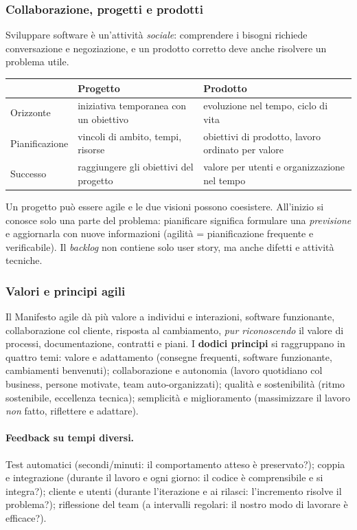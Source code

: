 \documentclass[a4paper,12pt]{article}
\begin{document}
\subsubsection{Collaborazione, progetti e prodotti}
Sviluppare software è un'attività \emph{sociale}: comprendere i bisogni richiede
conversazione e negoziazione, e un prodotto corretto deve anche risolvere un problema utile.
\begin{center}
\begin{tabular}{|p{2.6cm}|p{6.2cm}|p{6.2cm}|}
\hline
 & \textbf{Progetto} & \textbf{Prodotto}\\
\hline
Orizzonte & iniziativa temporanea con un obiettivo & evoluzione nel tempo, ciclo di vita\\
Pianificazione & vincoli di ambito, tempi, risorse & obiettivi di prodotto, lavoro ordinato per valore\\
Successo & raggiungere gli obiettivi del progetto & valore per utenti e organizzazione nel tempo\\
\hline
\end{tabular}
\end{center}
Un progetto può essere agile e le due visioni possono coesistere. All'inizio si conosce
solo una parte del problema: pianificare significa formulare una \emph{previsione} e
aggiornarla con nuove informazioni (agilità = pianificazione frequente e verificabile).
Il \emph{backlog} non contiene solo user story, ma anche difetti e attività tecniche.

\subsubsection{Valori e principi agili}
Il Manifesto agile dà più valore a individui e interazioni, software funzionante,
collaborazione col cliente, risposta al cambiamento, \emph{pur riconoscendo} il valore di
processi, documentazione, contratti e piani. I \textbf{dodici principi} si raggruppano in
quattro temi: valore e adattamento (consegne frequenti, software funzionante, cambiamenti
benvenuti); collaborazione e autonomia (lavoro quotidiano col business, persone motivate,
team auto-organizzati); qualità e sostenibilità (ritmo sostenibile, eccellenza tecnica);
semplicità e miglioramento (massimizzare il lavoro \emph{non} fatto, riflettere e adattare).

\paragraph{Feedback su tempi diversi.} Test automatici (secondi/minuti: il comportamento
atteso è preservato?); coppia e integrazione (durante il lavoro e ogni giorno: il codice è
comprensibile e si integra?); cliente e utenti (durante l'iterazione e ai rilasci:
l'incremento risolve il problema?); riflessione del team (a intervalli regolari: il nostro
modo di lavorare è efficace?).
\end{document}

